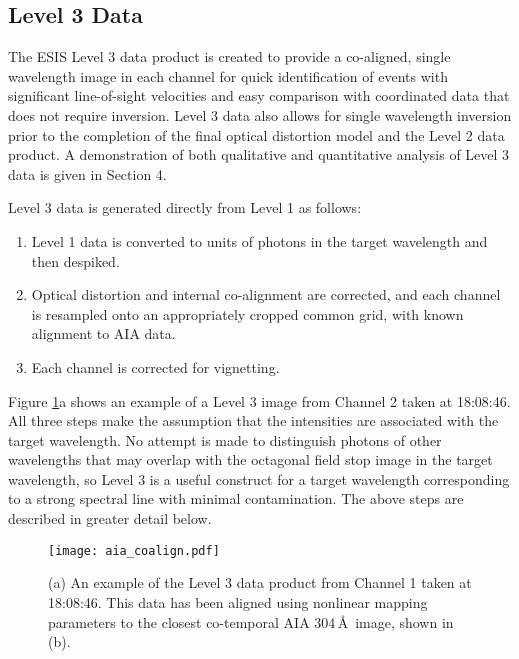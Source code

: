 \subsection{Level 3 Data} \label{sec:level 3}
 
    
\newcommand{\vigfit}{[.35, 0.28, 0.34, 0.6]}
\newcommand{\levthreetime}{18:08:46}

The ESIS Level 3 data product is created to provide a co-aligned, single wavelength image in each channel for quick identification of events with significant line-of-sight velocities and easy comparison with coordinated data that does not require inversion. 
Level 3 data also allows for single wavelength inversion prior to the completion of the final optical distortion model and the Level 2 data product.  A demonstration of both qualitative and quantitative analysis of Level 3 data is given in Section 4.  

Level 3 data is generated directly from Level 1 as follows:
\begin{enumerate}
    \item Level 1 data is converted to units of photons in the target wavelength and then despiked.\label{step:photons}
    \item Optical distortion and internal co-alignment are corrected, and each channel is resampled onto an appropriately cropped common grid, with known alignment to AIA data.\label{step:distortion}
    \item Each channel is corrected for vignetting.\label{step:vignetting}
\end{enumerate}
Figure \ref{fig:coalign}a shows an example of a Level 3 image from Channel 2 taken at \levthreetime. All three steps make the assumption that the intensities are associated with the target wavelength. No attempt is made to distinguish photons of other wavelengths that may overlap with the octagonal field stop image in the target wavelength, so Level 3 is a useful construct for a target wavelength corresponding to a strong spectral line with minimal contamination. The above steps are described in greater detail below.


	\begin{figure}
		\centering
		\texttt{[image: aia\_coalign.pdf]}
		\caption{(a) An example of the Level 3 data product from Channel 1 taken at \levthreetime. This data has been aligned using nonlinear mapping parameters to the closest co-temporal AIA 304\,\AA\ image, shown in (b). }
		\label{fig:coalign}
	\end{figure}
    	
